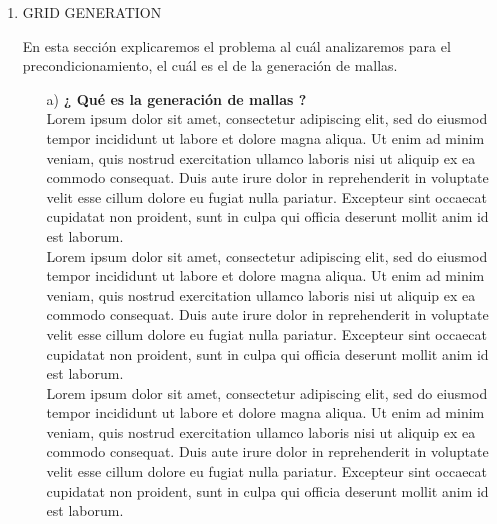 \documentclass{article}
\begin{document}
\begin{enumerate}

\item GRID GENERATION

En esta sección explicaremos el problema al cu\'al analizaremos para el precondicionamiento, el cu\'al
es el de la generaci\'on de mallas.

\begin{itemize}


\item[a)] \textbf{ ¿ Qu\'e es la generaci\'on de mallas ? }
\\

Lorem ipsum dolor sit amet, consectetur adipiscing elit, sed do eiusmod tempor incididunt ut labore et dolore magna aliqua. Ut enim ad minim veniam, quis nostrud exercitation ullamco laboris nisi ut aliquip ex ea commodo consequat. Duis aute irure dolor in reprehenderit in voluptate velit esse cillum dolore eu fugiat nulla pariatur. Excepteur sint occaecat cupidatat non proident, sunt in culpa qui officia deserunt mollit anim id est laborum.
\\


Lorem ipsum dolor sit amet, consectetur adipiscing elit, sed do eiusmod tempor incididunt ut labore et dolore magna aliqua. Ut enim ad minim veniam, quis nostrud exercitation ullamco laboris nisi ut aliquip ex ea commodo consequat. Duis aute irure dolor in reprehenderit in voluptate velit esse cillum dolore eu fugiat nulla pariatur. Excepteur sint occaecat cupidatat non proident, sunt in culpa qui officia deserunt mollit anim id est laborum.
\\


Lorem ipsum dolor sit amet, consectetur adipiscing elit, sed do eiusmod tempor incididunt ut labore et dolore magna aliqua. Ut enim ad minim veniam, quis nostrud exercitation ullamco laboris nisi ut aliquip ex ea commodo consequat. Duis aute irure dolor in reprehenderit in voluptate velit esse cillum dolore eu fugiat nulla pariatur. Excepteur sint occaecat cupidatat non proident, sunt in culpa qui officia deserunt mollit anim id est laborum.
\\


\end{itemize}
\end{enumerate}
\end{document}
